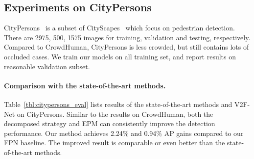 \documentclass[10pt,twocolumn,letterpaper]{article}
\begin{document}
\subsection{Experiments on CityPersons}
CityPersons~\cite{zhang2017citypersons} is a subset of CityScapes~\cite{cordts2016cityscapes} which focus on pedestrian detection. There are 2975, 500, 1575 images for training, validation and testing, respectively. Compared to CrowdHuman, CityPersons is less crowded, but still contains lots of occluded cases. We train our models on all training set, and report results on reasonable validation subset.

\paragraph{Comparison with the state-of-the-art methods.} Table~\ref{tbl:citypersons_eval} lists results of the state-of-the-art methods and V2F-Net on CityPersons. Similar to the results on CrowdHuman, both the decomposed strategy and EPM can consistently improve the detection performance. Our method achieves 2.24\%  and 0.94\% AP gains compared to our FPN baseline. The improved result is comparable or even better than the state-of-the-art methods.
\end{document}
